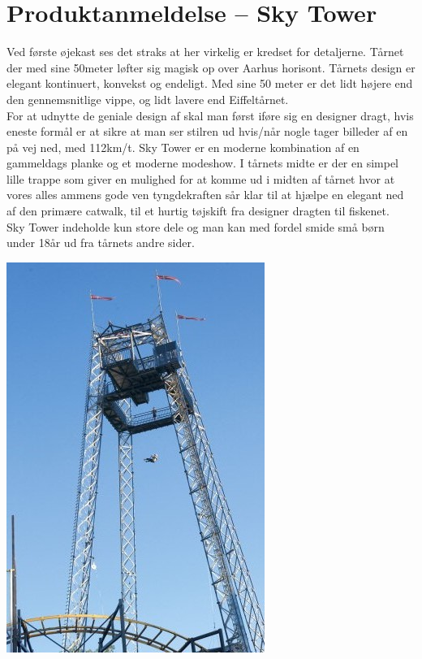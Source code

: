 \begin{minipage}[t]{100mm}
\section*{Produktanmeldelse – Sky Tower}
Ved første øjekast ses det straks at her virkelig er kredset for detaljerne. Tårnet der med sine 50meter løfter sig magisk op over Aarhus horisont. Tårnets design er elegant kontinuert, konvekst og endeligt. Med sine 50 meter er det lidt højere end den gennemsnitlige vippe, og lidt lavere end Eiffeltårnet. \\
For at udnytte de geniale design af skal man først iføre sig en designer dragt, hvis eneste formål er at sikre at man ser stilren ud hvis/når nogle tager billeder af en på vej ned, med 112km/t. Sky Tower er en moderne kombination af en gammeldags planke og et moderne modeshow. I tårnets midte er der en simpel lille trappe som giver en mulighed for at komme ud i midten af tårnet hvor at vores alles ammens gode ven tyngdekraften sår klar til at hjælpe en elegant ned af den primære catwalk, til et hurtig tøjskift fra designer dragten til fiskenet.\\
Sky Tower indeholde kun store dele og man kan med fordel smide små børn under 18år ud fra tårnets andre sider.
\begin{center}
\includegraphics[width=0.5\linewidth]{Sky_Tower.jpg}
\end{center}
\end{minipage}

